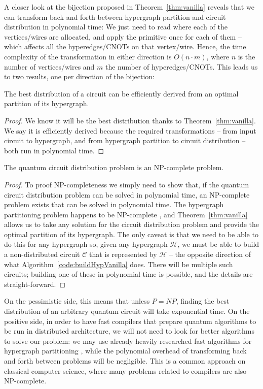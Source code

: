 A closer look at the bijection proposed in Theorem~\ref{thm:vanilla} reveals that we can transform back and forth between hypergraph partition and circuit distribution in polynomial time: We just need to read where each of the vertices/wires are allocated, and apply the primitive once for each of them -- which affects all the hyperedges/CNOTs on that vertex/wire. Hence, the time complexity of the transformation in either direction is \(O(n\cdot m)\), where \(n\) is the number of vertices/wires and \(m\) the number of hyperedges/CNOTs. This leads us to two results, one per direction of the bijection:

\begin{corollary} The best distribution of a circuit can be efficiently derived from an optimal partition of its hypergraph.
\end{corollary} \begin{proof}
We know it will be the best distribution thanks to Theorem~\ref{thm:vanilla}. We say it is efficiently derived because the required transformations -- from input circuit to hypergraph, and from hypergraph partition to circuit distribution -- both run in polynomial time.

\end{proof}

\begin{corollary} The quantum circuit distribution problem is an NP-complete problem.
\end{corollary} \begin{proof}
To proof NP-completeness we simply need to show that, if the quantum circuit distribution problem can be solved in polynomial time, an NP-complete problem exists that can be solved in polynomial time. The hypergraph partitioning problem happens to be NP-complete \citep{NP-complete}, and Theorem~\ref{thm:vanilla} allows us to take any solution for the circuit distribution problem and provide the optimal partition of its hypergraph. The only caveat is that we need to be able to do this for any hypergraph so, given any hypergraph \(\mathcal{H}\), we must be able to build a non-distributed circuit \(\mathcal{C}\) that is represented by \(\mathcal{H}\) -- the opposite direction of what Algorithm~\ref{code:buildHypVanilla} does. There will be multiple such circuits; building one of these in polynomial time is possible, and the details are straight-forward.

\end{proof}

On the pessimistic side, this means that unless \(P=NP\), finding the best distribution of an arbitrary quantum circuit will take exponential time. On the positive side, in order to have fast compilers that prepare quantum algorithms to be run in distributed architecture, we will not need to look for better algorithms to solve our problem: we may use already heavily researched fast algorithms for hypergraph partitioning \citep{KaHyPart}, while the polynomial overhead of transforming back and forth between problems will be negligible. This is a common approach on classical computer science, where many problems related to compilers are also NP-complete.

